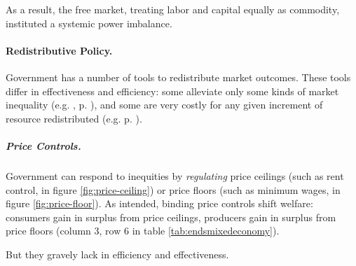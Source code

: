 As a result, the free market, treating labor and capital equally as commodity, instituted a systemic power imbalance.	


\paragraph{Redistributive Policy.}  \label{sec:redistributivepolicy} Government has a number of tools to redistribute market outcomes. These tools differ in effectiveness and efficiency: some alleviate only some kinds of market inequality (e.g. ,  p. \pageref{sec:affirmativeaction}), and some are very costly for any given increment of resource redistributed (e.g.  p. \pageref{sec:pricecontrols}).

\subparagraph{Price Controls.}  \label{sec:pricecontrols} Government can respond to inequities by \emph{regulating} price ceilings (such as rent control, in figure \ref{fig:price-ceiling}) or price floors (such as minimum wages, in figure \ref{fig:price-floor}). As intended, binding price controls shift welfare: consumers gain in surplus from price ceilings, producers gain in surplus from price floors (column 3, row 6 in table \ref{tab:endsmixedeconomy}).

But they gravely lack in efficiency and effectiveness.

